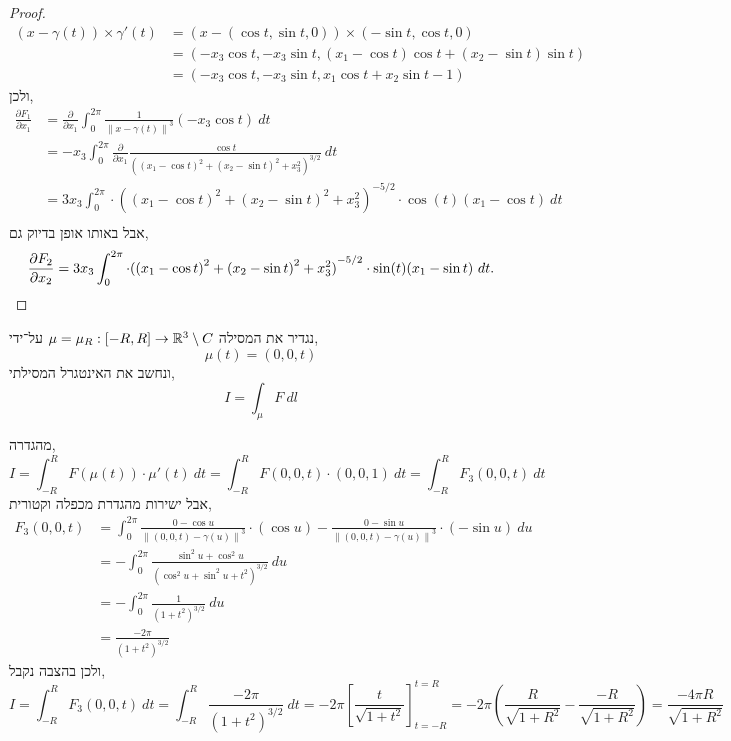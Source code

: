 \begin{proof}
	\begin{align*}
		(x - \gamma(t)) \times \gamma'(t)
		& = (x - (\cos t, \sin t, 0)) \times (- \sin t, \cos t, 0) \\
		& = (- x_3 \cos t, - x_3 \sin t, (x_1 - \cos t) \cos t + (x_2 - \sin t) \sin t) \\
		& = (- x_3 \cos t, - x_3 \sin t, x_1 \cos t + x_2 \sin t - 1)
	\end{align*}
	ולכן,
	\begin{align*}
		\frac{\partial F_1}{\partial x_1}
		& = \frac{\partial}{\partial x_1} \int_{0}^{2 \pi} \frac{1}{{\lVert x - \gamma(t) \rVert}^3} (-x_3 \cos t)\ dt \\
		& = -x_3 \int_{0}^{2 \pi} \frac{\partial}{\partial x_1} \frac{\cos t}{{({(x_1 - \cos t)}^2 + {(x_2 - \sin t)}^2 + x_3^2)}^{3 / 2}}\ dt \\
		& = 3 x_3 \int_{0}^{2 \pi} \cdot {({(x_1 - \cos t)}^2 + {(x_2 - \sin t)}^2 + x_3^2)}^{-5 / 2} \cdot \cos(t) (x_1 - \cos t)\ dt \\
	\end{align*}
	אבל באותו אופן בדיוק גם,
	\[
		\frac{\partial F_2}{\partial x_2}
		= 3 x_3 \int_{0}^{2 \pi} \cdot {({(x_1 - \cos t)}^2 + {(x_2 - \sin t)}^2 + x_3^2)}^{-5 / 2} \cdot \sin(t) (x_1 - \sin t)\ dt \\
	.\]
\end{proof}

\subquestion{}
נגדיר את המסילה $\mu = \mu_R : [-R, R] \to \mathbb{R}^3 \setminus C$ על־ידי,
\[
	\mu(t)
	= (0, 0, t)
\]
ונחשב את האינטגרל המסילתי,
\[
	I = \int_{\mu} F\ dl
\]
\begin{solution}
	מהגדרה,
	\[
		I
		= \int_{-R}^{R} F(\mu(t)) \cdot \mu'(t)\ dt
		= \int_{-R}^{R} F(0, 0, t) \cdot (0, 0, 1)\ dt
		= \int_{-R}^{R} F_3(0, 0, t)\ dt
	\]
	אבל ישירות מהגדרת מכפלה וקטורית,
	\begin{align*}
		F_3(0, 0, t)
		& = \int_{0}^{2 \pi} \frac{0 - \cos u}{{\lVert (0, 0, t) - \gamma(u) \rVert}^3} \cdot (\cos u) - \frac{0 - \sin u}{{\lVert (0, 0, t) - \gamma(u) \rVert}^3} \cdot (- \sin u)\ du \\
		& = - \int_{0}^{2 \pi} \frac{\sin^2 u + \cos^2 u}{{(\cos^2 u + \sin^2 u + t^2)}^{3 / 2}}\ du \\
		& = - \int_{0}^{2 \pi} \frac{1}{{(1 + t^2)}^{3 / 2}}\ du \\
		& = \frac{-2 \pi}{{(1 + t^2)}^{3 / 2}}
	\end{align*}
	ולכן בהצבה נקבל,
	\[
		I
		= \int_{-R}^{R} F_3(0, 0, t)\ dt
		= \int_{-R}^{R} \frac{-2 \pi}{{(1 + t^2)}^{3 / 2}}\ dt
		= - 2 \pi {\left[ \frac{t}{\sqrt{1 + t^2}}\right]}_{t = -R}^{t = R}
		= - 2 \pi \left(\frac{R}{\sqrt{1 + R^2}} - \frac{-R}{\sqrt{1 + R^2}}\right)
		= \frac{-4 \pi R}{\sqrt{1 + R^2}}
	\]
\end{solution}

